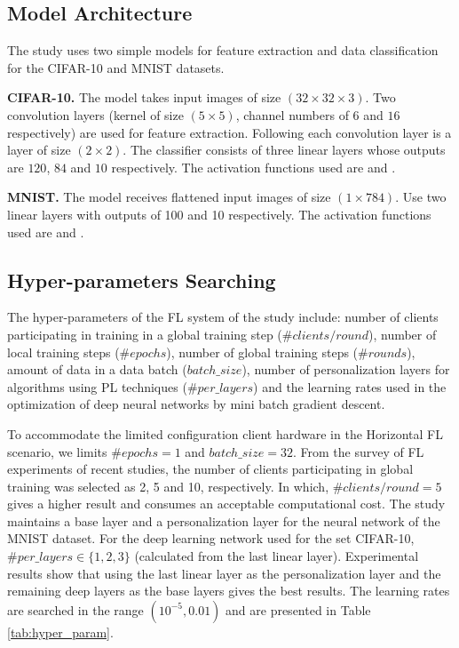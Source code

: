 \documentclass[runningheads]{llncs}
\begin{document}
\subsection{Model Architecture}
\label{model_architecture}

The study uses two simple models for feature extraction and data classification for the CIFAR-10 and MNIST datasets.

\textbf{CIFAR-10.} The model takes input images of size $(32\times32\times3)$. Two convolution layers (kernel of size $(5\times5)$, channel numbers of $6$ and $16$ respectively) are used for feature extraction. Following each convolution layer is a  layer of size $(2\times2)$. The classifier consists of three linear layers whose outputs are $120$, $84$ and $10$ respectively. The activation functions used are  and .

\textbf{MNIST.} The model receives flattened input images of size $(1\times784)$. Use two linear layers with outputs of 100 and 10 respectively. The activation functions used are  and .

\subsection{Hyper-parameters Searching}

The hyper-parameters of the FL system of the study include: number of clients participating in training in a global training step ($\#clients/round$), number of local training steps ($\#epochs $), number of global training steps ($\#rounds$), amount of data in a data batch ($batch\_size$), number of personalization layers for algorithms using PL techniques ($\# per\_layers$) and the learning rates used in the optimization of deep neural networks by mini batch gradient descent.

To accommodate the limited configuration client hardware in the Horizontal FL scenario, we limits $\#epochs=1$ and $batch\_size=32$. From the survey of FL experiments of recent studies, the number of clients participating in global training was selected as 2, 5 and 10, respectively. In which, $\#clients/round=5$ gives a higher result and consumes an acceptable computational cost. The study maintains a base layer and a personalization layer for the neural network of the MNIST dataset. For the deep learning network used for the set CIFAR-10, $\#per\_layers \in \{1,2,3\}$ (calculated from the last linear layer). Experimental results show that using the last linear layer as the personalization layer and the remaining deep layers as the base layers gives the best results. The learning rates are searched in the range $(10^{-5}, 0.01)$ and are presented in Table \ref{tab:hyper_param}.
\end{document}
